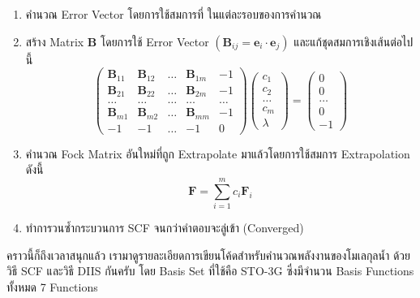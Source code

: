 \begin{enumerate}[topsep=0pt,noitemsep]
  \setlength\itemsep{1em}
  \item คำนวณ Error Vector โดยการใช้สมการที่  ในแต่ละรอบของการคำนวณ
  
  \item สร้าง Matrix $\mathbf{B}$ โดยการใช้ Error Vector $(\mathbf{B}_{ij} = \mathbf{e}_i \cdot \mathbf{e}_j)$ 
  และแก้ชุดสมการเชิงเส้นต่อไปนี้
  \begin{equation}
    \begin{pmatrix} 
      \mathbf{B}_{11} & \mathbf{B}_{12} & \dots & \mathbf{B}_{1m} & -1 \\ 
      \mathbf{B}_{21} & \mathbf{B}_{22} & \dots & \mathbf{B}_{2m} & -1 \\ 
      \dots & \dots & \dots & \dots & \dots \\ 
      \mathbf{B}_{m1} & \mathbf{B}_{m2} & \dots & \mathbf{B}_{mm} & -1 \\ 
      -1 & -1 & \dots & -1 & 0 
    \end{pmatrix}
    \begin{pmatrix} 
      c_1 \\ 
      c_2 \\ 
      \dots \\ 
      c_m \\ 
      \lambda 
    \end{pmatrix} 
      =
    \begin{pmatrix} 
      0 \\ 
      0 \\ 
      \dots \\ 
      0 \\ 
      -1 
    \end{pmatrix}
  \end{equation}

  \item คำนวณ Fock Matrix อันใหม่ที่ถูก Extrapolate มาแล้วโดยการใช้สมการ Extrapolation ดังนี้ 
  \begin{equation}
    \mathbf{F} 
    = 
    \sum_{i=1}^{m} c_i \mathbf{F}_i
  \end{equation}

  \item ทำการวนซ้ำกระบวนการ SCF จนกว่าคำตอบจะลู่เข้า (Converged)
\end{enumerate}

คราวนี้ก็ถึงเวลาสนุกแล้ว เรามาดูรายละเอียดการเขียนโค้ดสำหรับคำนวณพลังงานของโมเลกุลน้ำ  ด้วยวิธี SCF และวิธี DIIS กันครับ 
โดย Basis Set ที่ใช้คือ STO-3G ซึ่งมีจำนวน Basis Functions ทั้งหมด 7 Functions 

